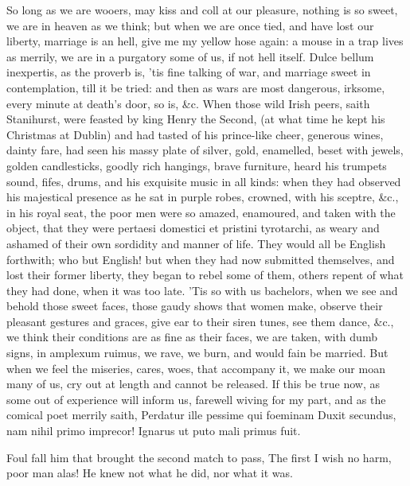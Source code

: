 {So long as we are wooers, may kiss and coll at our pleasure, nothing is
so sweet, we are in heaven as we think; but when we are once tied, and
have lost our liberty, marriage is an hell, give me my yellow hose
again: a mouse in a trap lives as merrily, we are in a purgatory some
of us, if not hell itself. Dulce bellum inexpertis, as the proverb is,
'tis fine talking of war, and marriage sweet in contemplation, till it
be tried: and then as wars are most dangerous, irksome, every minute at
death's door, so is, \&c. When those wild Irish peers, saith
Stanihurst, were feasted by king Henry the Second, (at what time
he kept his Christmas at Dublin) and had tasted of his prince-like
cheer, generous wines, dainty fare, had seen his massy plate of
silver, gold, enamelled, beset with jewels, golden candlesticks, goodly
rich hangings, brave furniture, heard his trumpets sound, fifes, drums,
and his exquisite music in all kinds: when they had observed his
majestical presence as he sat in purple robes, crowned, with his
sceptre, \&c., in his royal seat, the poor men were so amazed,
enamoured, and taken with the object, that they were pertaesi domestici
et pristini tyrotarchi, as weary and ashamed of their own sordidity and
manner of life. They would all be English forthwith; who but English!
but when they had now submitted themselves, and lost their former
liberty, they began to rebel some of them, others repent of what they
had done, when it was too late. 'Tis so with us bachelors, when we see
and behold those sweet faces, those gaudy shows that women make,
observe their pleasant gestures and graces, give ear to their siren
tunes, see them dance, \&c., we think their conditions are as fine as
their faces, we are taken, with dumb signs, in amplexum ruimus, we
rave, we burn, and would fain be married. But when we feel the
miseries, cares, woes, that accompany it, we make our moan many of us,
cry out at length and cannot be released. If this be true now, as some
out of experience will inform us, farewell wiving for my part, and as
the comical poet merrily saith,
Perdatur ille pessime qui foeminam
Duxit secundus, nam nihil primo imprecor!
Ignarus ut puto mali primus fuit.

Foul fall him that brought the second match to pass,
The first I wish no harm, poor man alas!
He knew not what he did, nor what it was.

}
